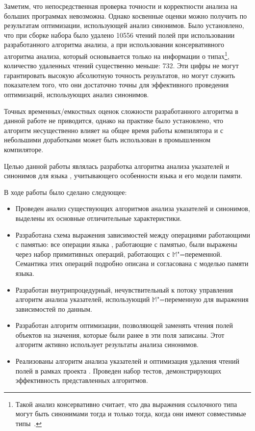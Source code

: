 \documentclass[14pt,titlepage,draft]{extarticle}
\newcommand{\java}{\eng{Java}\xspace}
\newcommand{\M}{\ensuremath{\mathbb{M}}}
\begin{document}
    Заметим, что непосредственная проверка точности и корректности анализа на
    больших программах невозможна. Однако косвенные оценки можно получить по
    результатам оптимизации, использующей анализ синонимов. Было установлено,
    что при сборке набора  было удалено \num{10556} чтений
    полей при использовании разработанного алгоритма анализа, а при
    использовании консервативного алгоритма анализа, который основывается
    только на  информации о типах\footnote{
      Такой анализ консервативно считает, что два выражения ссылочного типа
      могут быть синонимами тогда и только тогда, когда они имеют совместимые
      типы~\cite{diwan_tbaa}.
    },
    количество удаленных чтений существенно меньше: \num{732}.
    Эти цифры не могут гарантировать высокую абсолютную точность результатов,
    но могут служить показателем того, что они достаточно точны для
    эффективного проведения оптимизаций, использующих анализ синонимов.

    Точных временных\slash{}емкостных оценок сложности разработанного алгоритма в
    данной работе не приводится, однако на практике было установлено, что
    алгоритм несущественно влияет на общее время работы компилятора и с
    небольшими доработками может быть использован в промышленном компиляторе.


    Целью данной работы являлась разработка алгоритма анализа указателей и
    синонимов для языка \java, учитывающего особенности языка и его модели
    памяти.

    В ходе работы было сделано следующее:
    \begin{itemize}
      \item Проведен анализ существующих алгоритмов анализа указателей и
            синонимов, выделены их основные отличительные характеристики.
      \item Разработана схема выражения зависимостей между операциями
            работающими с памятью: все операции языка \java, работающие с
            памятью, были выражены через набор примитивных операций, работающих
            с \M"=переменной. Семантика этих операций подробно описана и
            согласована с моделью памяти языка.
      \item Разработан внутрипроцедурный, нечувствительный к потоку управления
            алгоритм анализа указателей, использующий \M"=переменную для
            выражения зависимостей по данным.
      \item Разработан алгоритм оптимизации, позволяющей заменять чтения полей
            объектов на значения, которые были ранее в эти поля записаны. Этот
            алгоритм активно использует результаты анализа синонимов.
      \item Реализованы алгоритм анализа указателей и оптимизация удаления
            чтений полей в рамках проекта . Проведен набор
            тестов, демонстрирующих эффективность представленных алгоритмов.
    \end{itemize}
\end{document}
